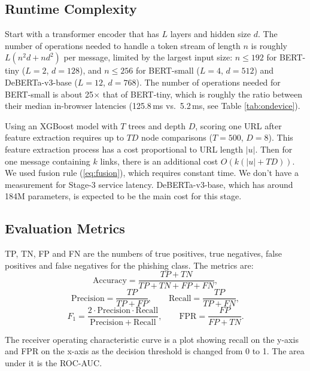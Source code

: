 \documentclass[conference]{IEEEtran}
\begin{document}
\subsection{Runtime Complexity}
Start with a transformer encoder that has $L$ layers and hidden size $d$. The number of operations needed to handle a token stream of length $n$ is roughly $L(n^2 d + n d^2)$ per message, limited by the largest input size: $n \le 192$ for BERT-tiny ($L = 2$, $d = 128$), and $n \le 256$ for BERT-small ($L = 4$, $d = 512$) and DeBERTa-v3-base ($L = 12$, $d = 768$). The number of operations needed for BERT-small is about 25$\times$ that of BERT-tiny, which is roughly the ratio between their median in-browser latencies (125.8\,ms vs.\ 5.2\,ms, see Table \ref{tab:ondevice}).

Using an XGBoost model with $T$ trees and depth $D$, scoring one URL after feature extraction requires up to $T D$ node comparisons ($T = 500$, $D = 8$). This feature extraction process has a cost proportional to URL length $|u|$. Then for one message containing $k$ links, there is an additional cost $O(k(|u| + T D))$. We used fusion rule (\ref{eq:fusion}), which requires constant time. We don't have a measurement for Stage-3 service latency. DeBERTa-v3-base, which has around 184M parameters, is expected to be the main cost for this stage.

\subsection{Evaluation Metrics}
TP, TN, FP and FN are the numbers of true positives, true negatives, false positives and false negatives for the phishing class. The metrics are:
\begin{equation}
\mathrm{Accuracy} = \frac{TP + TN}{TP + TN + FP + FN},
\label{eq:acc}
\end{equation}
\begin{equation}
\mathrm{Precision} = \frac{TP}{TP + FP}, \qquad \mathrm{Recall} = \frac{TP}{TP + FN},
\label{eq:pr}
\end{equation}
\begin{equation}
F_1 = \frac{2 \cdot \mathrm{Precision} \cdot \mathrm{Recall}}{\mathrm{Precision} + \mathrm{Recall}}, \qquad \mathrm{FPR} = \frac{FP}{FP + TN}.
\label{eq:prf}
\end{equation}

The receiver operating characteristic curve is a plot showing recall on the y-axis and FPR on the x-axis as the decision threshold is changed from 0 to 1. The area under it is the ROC-AUC.
\end{document}
